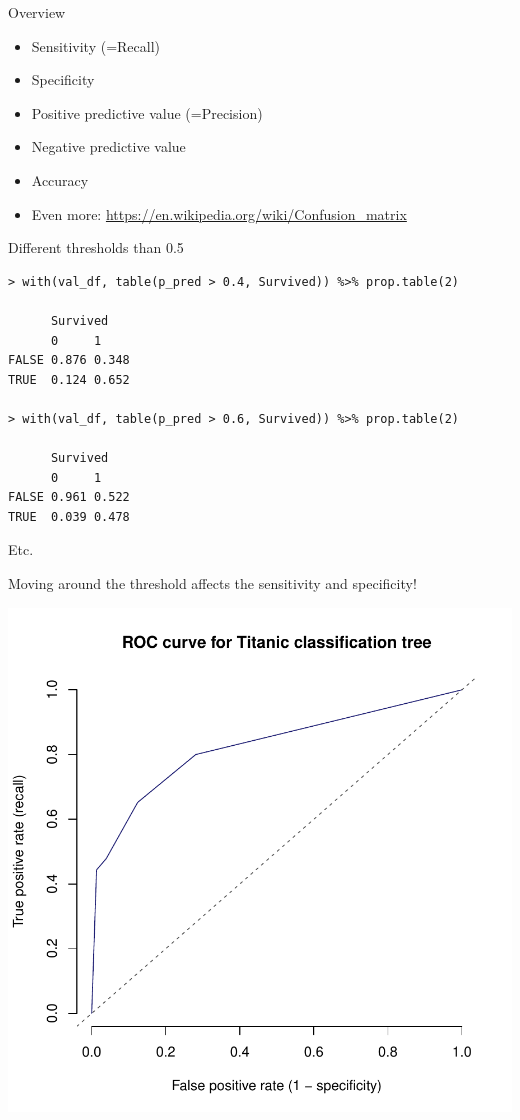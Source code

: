 \documentclass[xcolor=table,aspectratio=169]{beamer}
\begin{document}
\begin{frame}
	{Overview}
	
	\begin{itemize}
		\item Sensitivity (=Recall)
		\item Specificity
		\item Positive predictive value (=Precision)
		\item Negative predictive value
		\item Accuracy
		\item Even more: \url{https://en.wikipedia.org/wiki/Confusion_matrix}
	\end{itemize}
\end{frame}


\begin{frame}[fragile]{Different thresholds than 0.5}
	
	\begin{scriptsize}
		\begin{verbatim}
> with(val_df, table(p_pred > 0.4, Survived)) %>% prop.table(2)

      Survived
      0     1
FALSE 0.876 0.348
TRUE  0.124 0.652

> with(val_df, table(p_pred > 0.6, Survived)) %>% prop.table(2)

      Survived
      0     1
FALSE 0.961 0.522
TRUE  0.039 0.478
\end{verbatim}
	\end{scriptsize}
	Etc.
	
	Moving around the threshold affects the sensitivity and specificity!
\end{frame}

\begin{frame}
	\includegraphics[height=\textheight]{pics/Titanic_tree_roc}
\end{frame}
\end{document}

